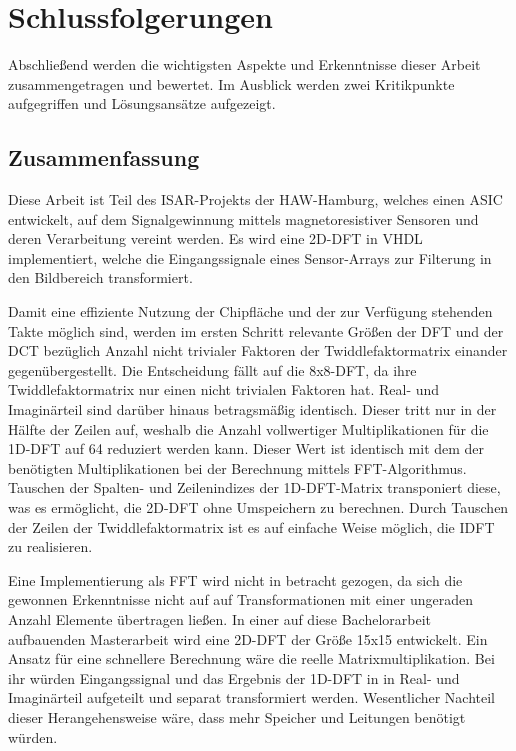  

 \chapter{Schlussfolgerungen}
 Abschließend werden die wichtigsten Aspekte und Erkenntnisse dieser Arbeit zusammengetragen und bewertet. Im Ausblick werden zwei Kritikpunkte aufgegriffen und Lösungsansätze
 aufgezeigt.
 
 \section{Zusammenfassung}
 
 Diese Arbeit ist Teil des ISAR-Projekts der HAW-Hamburg, welches einen ASIC entwickelt, auf dem Signalgewinnung mittels magnetoresistiver Sensoren und deren Verarbeitung vereint werden.
 Es wird eine 2D-DFT in VHDL implementiert, welche die Eingangssignale eines Sensor-Arrays zur Filterung in den Bildbereich transformiert.
 
 Damit eine effiziente Nutzung der Chipfläche und der zur Verfügung stehenden Takte möglich sind, werden im ersten Schritt relevante Größen der DFT und der DCT bezüglich Anzahl nicht trivialer Faktoren der Twiddlefaktormatrix einander gegenübergestellt.
 Die Entscheidung fällt auf die 8x8-DFT, da ihre Twiddlefaktormatrix nur einen nicht trivialen Faktoren hat. Real- und Imaginärteil sind darüber hinaus betragsmäßig identisch.
 Dieser tritt nur in der Hälfte der Zeilen auf, weshalb die Anzahl vollwertiger Multiplikationen für
 die 1D-DFT auf 64 reduziert werden kann. Dieser Wert ist identisch mit dem der benötigten Multiplikationen bei der Berechnung mittels FFT-Algorithmus.
 Tauschen der Spalten- und Zeilenindizes der 1D-DFT-Matrix transponiert diese, was es ermöglicht, die 2D-DFT ohne Umspeichern zu berechnen.
 Durch Tauschen der Zeilen der Twiddlefaktormatrix ist es auf einfache Weise möglich, die IDFT zu realisieren.
 
 Eine Implementierung als FFT wird nicht in betracht gezogen, da sich die gewonnen Erkenntnisse nicht auf auf Transformationen mit einer ungeraden Anzahl Elemente übertragen ließen.
 In einer auf diese Bachelorarbeit aufbauenden Masterarbeit wird eine 2D-DFT der Größe 15x15 entwickelt.
 Ein Ansatz für eine schnellere Berechnung wäre die reelle Matrixmultiplikation. Bei ihr würden Eingangssignal und das Ergebnis der 1D-DFT in in Real- und Imaginärteil
 aufgeteilt und separat transformiert werden. Wesentlicher Nachteil dieser Herangehensweise wäre, dass mehr Speicher und Leitungen benötigt würden.
 
